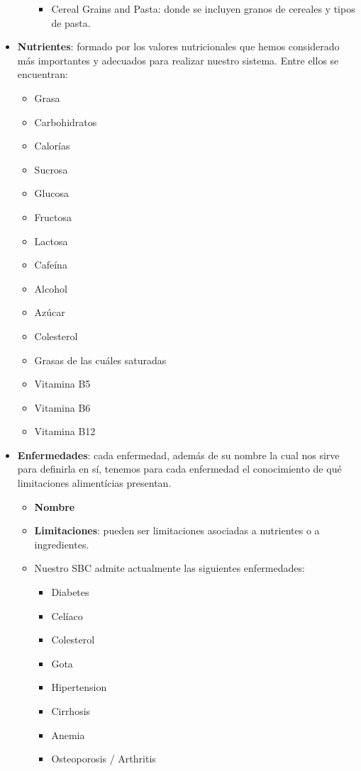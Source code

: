 \documentclass[12]{article}
\begin{document}
\begin{itemize}
\begin{itemize}
\begin{itemize}
			\item Cereal Grains and Pasta: donde se incluyen granos de cereales y tipos de pasta.
			\end{itemize}
		\end{itemize}
	\item \textbf{Nutrientes}: formado por los valores nutricionales que hemos considerado más importantes y adecuados para realizar nuestro sistema. Entre ellos se encuentran: 
	\begin{itemize} 
		\item Grasa
		\item Carbohidratos
		\item Calorías
		\item Sucrosa
		\item Glucosa
		\item Fructosa
		\item Lactosa
		\item Cafeína
		\item Alcohol
		\item Azúcar
		\item Colesterol
		\item Grasas de las cuáles saturadas
		\item Vitamina B5
		\item Vitamina B6
		\item Vitamina B12
	\end{itemize}


\item \textbf{Enfermedades}: cada enfermedad, además de su nombre la cual nos sirve para definirla en sí, tenemos para cada enfermedad el conocimiento de qué limitaciones alimentícias presentan. \begin{itemize}
	\item \textbf{Nombre}
	\item \textbf{Limitaciones}: pueden ser limitaciones asociadas a nutrientes o a ingredientes.
	\item Nuestro SBC admite actualmente las siguientes enfermedades:
		\begin{itemize}
		\item Diabetes
		\item Celíaco
		\item Colesterol
		\item Gota
		\item Hipertension
		\item Cirrhosis
		\item Anemia
		\item Osteoporosis / Arthritis
		\end{itemize}
\end{itemize}




\end{itemize}
\end{document}
